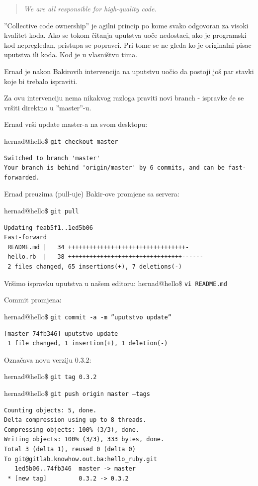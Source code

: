 \documentclass[times, utf8, seminar]{fit}
\begin{document}
\begin{itemize}
\begin{quotation}
  \emph{We are all responsible for high-quality code.}
\end{quotation}

''Collective code ownership''\citep[str. ]{agileart} je agilni princip po kome svako odgovoran za visoki kvalitet koda.
Ako se tokom čitanja uputstva uoče nedostaci, ako je programski kod nepregledan, pristupa se popravci.
Pri tome se ne gleda ko je originalni pisac uputstva ili koda. Kod je u vlasništvu tima.

Ernad je nakon Bakirovih intervencija na uputstvu uočio da postoji još par stavki koje bi trebalo ispraviti.

Za ovu intervenciju nema nikakvog razloga praviti novi branch - ispravke će se vršiti direktno u ''master''-u.

Ernad vrši update master-a na svom desktopu:

hernad@hello\ruby\$ \texttt{git checkout master}
\begin{lstlisting}
Switched to branch 'master'
Your branch is behind 'origin/master' by 6 commits, and can be fast-forwarded.
\end{lstlisting}

Ernad preuzima (pull-uje) Bakir-ove promjene sa servera:

hernad@hello\ruby\$ \texttt{git pull}
\begin{lstlisting}
Updating feab5f1..1ed5b06
Fast-forward
 README.md |   34 +++++++++++++++++++++++++++++++++-
 hello.rb  |   38 ++++++++++++++++++++++++++++++++------
 2 files changed, 65 insertions(+), 7 deletions(-)
\end{lstlisting}

Vršimo ispravku uputstva u našem editoru:
hernad@hello\ruby\$ \texttt{vi README.md}

Commit promjena:

hernad@hello\ruby\$ \texttt{git commit -a -m ''uputstvo update''}
\begin{lstlisting}
[master 74fb346] uputstvo update
 1 file changed, 1 insertion(+), 1 deletion(-)
\end{lstlisting}

Označava novu verziju 0.3.2:

hernad@hello\ruby\$ \texttt{git tag 0.3.2}

hernad@hello\ruby\$ \texttt{git push origin master --tags}
\begin{lstlisting}
Counting objects: 5, done.
Delta compression using up to 8 threads.
Compressing objects: 100% (3/3), done.
Writing objects: 100% (3/3), 333 bytes, done.
Total 3 (delta 1), reused 0 (delta 0)
To git@gitlab.knowhow.out.ba:hello_ruby.git
   1ed5b06..74fb346  master -> master
 * [new tag]         0.3.2 -> 0.3.2
\end{lstlisting}


\end{itemize}
\end{document}
